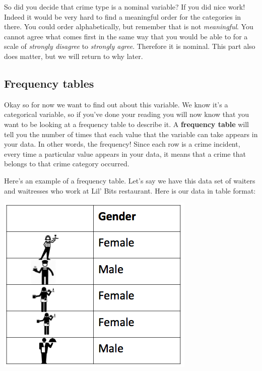 \documentclass[]{book}
\theoremstyle{definition}
\theoremstyle{definition}
\theoremstyle{definition}
\theoremstyle{remark}
\begin{document}
So did you decide that crime type is a nominal variable? If you did nice
work! Indeed it would be very hard to find a meaningful order for the
categories in there. You could order alphabetically, but remember that
is not \emph{meaningful}. You cannot agree what comes first in the same
way that you would be able to for a scale of \emph{strongly disagree} to
\emph{strongly agree}. Therefore it is nominal. This part also does
matter, but we will return to why later.

\hypertarget{frequency-tables}{%
\subsection{Frequency tables}\label{frequency-tables}}

Okay so for now we want to find out about this variable. We know it's a
categorical variable, so if you've done your reading you will now know
that you want to be looking at a frequency table to describe it. A
\textbf{frequency table} will tell you the number of times that each
value that the variable can take appears in your data. In other words,
the frequency! Since each row is a crime incident, every time a
particular value appears in your data, it means that a crime that
belongs to that crime category occurred.

Here's an example of a frequency table. Let's say we have this data set
of waiters and waitresses who work at Lil' Bits restaurant. Here is our
data in table format:

\includegraphics{imgs/waiter_heights.png}
\end{document}
